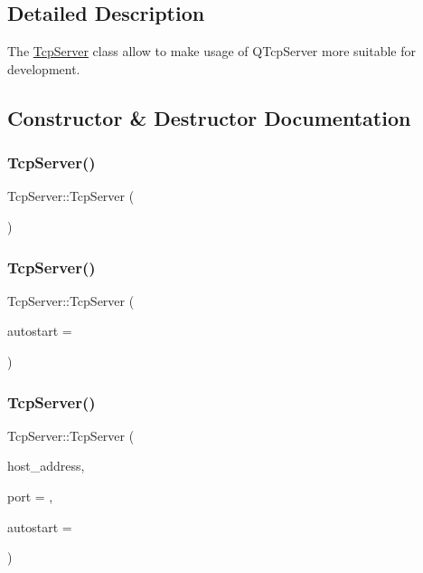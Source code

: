 \subsection{Detailed Description}
The \mbox{\hyperlink{class_tcp_server}{Tcp\+Server}} class allow to make usage of Q\+Tcp\+Server more suitable for development. 

\subsection{Constructor \& Destructor Documentation}
\mbox{\label{class_tcp_server_abc977059ef61f1c42f5fda1bc5945ab0}} 
\subsubsection{\texorpdfstring{TcpServer()}{TcpServer()}\hspace{0.1cm}{\footnotesize\ttfamily [1/3]}}
{\footnotesize\ttfamily Tcp\+Server\+::\+Tcp\+Server (\begin{DoxyParamCaption}{ }\end{DoxyParamCaption})\hspace{0.3cm}{\ttfamily [explicit]}}

\mbox{\label{class_tcp_server_af43d51237b45ebb729911d829dfa7856}} 
\subsubsection{\texorpdfstring{TcpServer()}{TcpServer()}\hspace{0.1cm}{\footnotesize\ttfamily [2/3]}}
{\footnotesize\ttfamily Tcp\+Server\+::\+Tcp\+Server (\begin{DoxyParamCaption}\item[{bool}]{autostart = {} }\end{DoxyParamCaption})}

\mbox{\label{class_tcp_server_a5242d1465353dd6e57bf556416021598}} 
\subsubsection{\texorpdfstring{TcpServer()}{TcpServer()}\hspace{0.1cm}{\footnotesize\ttfamily [3/3]}}
{\footnotesize\ttfamily Tcp\+Server\+::\+Tcp\+Server (\begin{DoxyParamCaption}\item[{Q\+String \&}]{host\+\_\+address,  }\item[{quint16}]{port = {},  }\item[{bool}]{autostart = {} }\end{DoxyParamCaption})}

